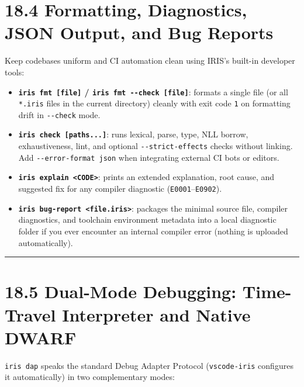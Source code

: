 \documentclass[
  english,
  oneside]{book}
\providecommand{\tightlist}{%
  \setlength{\itemsep}{0pt}\setlength{\parskip}{0pt}}
\begin{document}
\section{18.4 Formatting, Diagnostics, JSON Output, and Bug
Reports}\label{formatting-diagnostics-json-output-and-bug-reports}

Keep codebases uniform and CI automation clean using IRIS's built-in
developer tools:

\begin{itemize}
\tightlist
\item
  \textbf{\texttt{iris\ fmt\ {[}file{]}} /
  \texttt{iris\ fmt\ -\/-check\ {[}file{]}}}: formats a single file (or
  all \texttt{*.iris} files in the current directory) cleanly with exit
  code \texttt{1} on formatting drift in \texttt{-\/-check} mode.
\item
  \textbf{\texttt{iris\ check\ {[}paths...{]}}}: runs lexical, parse,
  type, NLL borrow, exhaustiveness, lint, and optional
  \texttt{-\/-strict-effects} checks without linking. Add
  \texttt{-\/-error-format\ json} when integrating external CI bots or
  editors.
\item
  \textbf{\texttt{iris\ explain\ \textless{}CODE\textgreater{}}}: prints
  an extended explanation, root cause, and suggested fix for any
  compiler diagnostic (\texttt{E0001}--\texttt{E0902}).
\item
  \textbf{\texttt{iris\ bug-report\ \textless{}file.iris\textgreater{}}}:
  packages the minimal source file, compiler diagnostics, and toolchain
  environment metadata into a local diagnostic folder if you ever
  encounter an internal compiler error (nothing is uploaded
  automatically).
\end{itemize}

\begin{center}\rule{0.5\linewidth}{0.5pt}\end{center}

\section{18.5 Dual-Mode Debugging: Time-Travel Interpreter and Native
DWARF}\label{dual-mode-debugging-time-travel-interpreter-and-native-dwarf}

\texttt{iris\ dap} speaks the standard Debug Adapter Protocol
(\texttt{vscode-iris} configures it automatically) in two complementary
modes:
\end{document}
